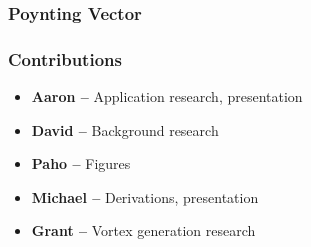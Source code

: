 \documentclass[xcolor=dvipsnames]{beamer}
\newenvironment{items}[1][]
{\begin{itemize}
    \ifthenelse{\isempty{#1}}
    {\setlength{\itemsep}{12pt}}{\setlength{\itemsep}{#1}}}
  {\end{itemize}}
\begin{document}
\begin{frame}
  \frametitle{Poynting Vector}
  \begin{figure}[h]
    \centering
  \end{figure}
\end{frame}

\begin{frame}
  \frametitle{Contributions}
  \begin{items}
  \item \textbf{Aaron --} Application research, presentation
  \item \textbf{David --} Background research
  \item \textbf{Paho --} Figures
  \item \textbf{Michael --} Derivations, presentation
  \item \textbf{Grant --} Vortex generation research
  \end{items}
\end{frame}
\end{document}
